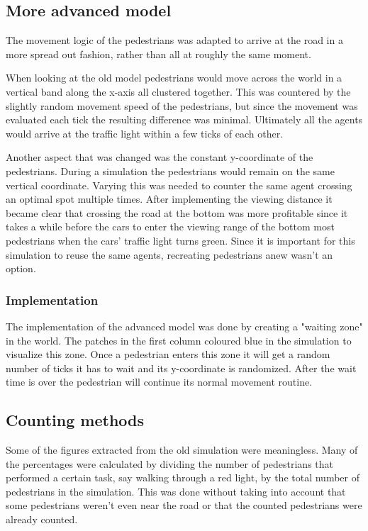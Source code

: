 \documentclass[a4paper]{article}
\begin{document}
\subsection{More advanced model}
The movement logic of the pedestrians was adapted to arrive at the road in a more spread out fashion, rather than all at roughly the same moment.

When looking at the old model pedestrians would move across the world in a vertical band along the x-axis all clustered together. This was countered by the slightly random movement speed of the pedestrians, but since the movement was evaluated each tick the resulting difference was minimal. Ultimately all the agents would arrive at the traffic light within a few ticks of each other.

Another aspect that was changed was the constant y-coordinate of the pedestrians. During a simulation the pedestrians would remain on the same vertical coordinate. Varying this was needed to counter the same agent crossing an optimal spot multiple times. After implementing the viewing distance it became clear that crossing the road at the bottom was more profitable since it takes a while before the cars to enter the viewing range of the bottom most pedestrians when the cars' traffic light turns green.
Since it is important for this simulation to reuse the same agents, recreating pedestrians anew wasn't an option.

\subsubsection{Implementation}
The implementation of the advanced model was done by creating a "waiting zone" in the world. The patches in the first column coloured blue in the simulation to visualize this zone. Once a pedestrian enters this zone it will get a random number of ticks it has to wait and its y-coordinate is randomized.
After the wait time is over the pedestrian will continue its normal movement routine.

\subsection{Counting methods}
Some of the figures extracted from the old simulation were meaningless. Many of the percentages were calculated by dividing the number of pedestrians that performed a certain task, say walking through a red light, by the total number of pedestrians in the simulation. This was done without taking into account that some pedestrians weren't even near the road or that the counted pedestrians were already counted.
\end{document}
